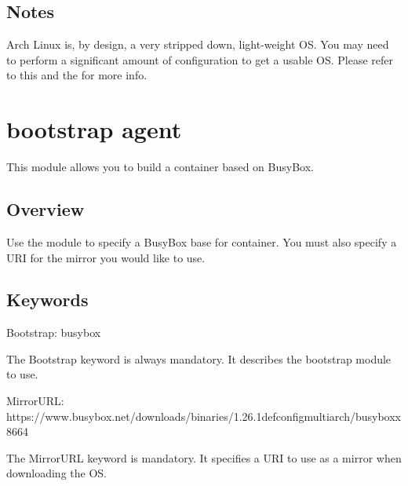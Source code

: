 \documentclass[letterpaper,10pt,english]{sphinxmanual}
\begin{document}
\subsection{Notes}
\label{\detokenize{appendix:id17}}
Arch Linux is, by design, a very stripped down, light-weight OS. You may need to
perform a significant amount of configuration to get a usable OS. Please refer
to this
and the
for more info.


\section{ bootstrap agent}
\label{\detokenize{appendix:busybox-bootstrap-agent}}\label{\detokenize{appendix:build-busybox}}\label{\detokenize{appendix:sec-build-busybox}}
This module allows you to build a container based on BusyBox.


\subsection{Overview}
\label{\detokenize{appendix:id18}}
Use the  module to specify a BusyBox base for container. You must
also specify a URI for the mirror you would like to use.


\subsection{Keywords}
\label{\detokenize{appendix:id19}}
%
\begin{sphinxVerbatim}[commandchars=\\\{\}]
Bootstrap: busybox
\end{sphinxVerbatim}

The Bootstrap keyword is always mandatory. It describes the bootstrap module to
use.

%
\begin{sphinxVerbatim}[commandchars=\\\{\}]
MirrorURL: https://www.busybox.net/downloads/binaries/1.26.1\PYGZhy{}defconfig\PYGZhy{}multiarch/busybox\PYGZhy{}x86\PYGZus{}64
\end{sphinxVerbatim}

The MirrorURL keyword is mandatory. It specifies a URI to use as a mirror when
downloading the OS.
\end{document}
